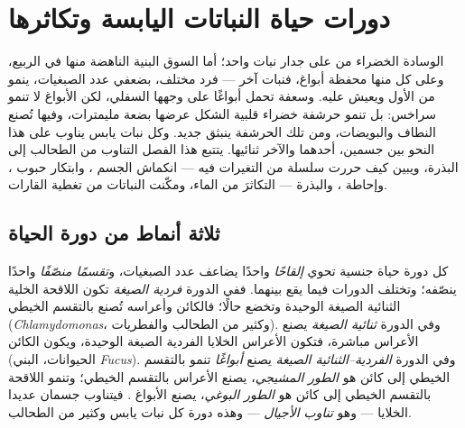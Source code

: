 \chapter{دورات حياة النباتات اليابسة وتكاثرها}\label{ch:b2:plant-life-cycles}

الوسادة الخضراء من  على جدار نبات واحد؛ أما السوق البنية
الناهضة منها في الربيع، وعلى كل منها محفظة أبواغ، فنبات آخر --- فرد
مختلف، بضعفي عدد الصبغيات، ينمو من الأول ويعيش عليه. وسعفة 
تحمل أبواغًا على وجهها السفلي، لكن الأبواغ لا تنمو سراخس: بل تنمو
حرشفة خضراء قلبية الشكل عرضها بضعة مليمترات، وفيها تُصنع النطاف
والبويضات، ومن تلك الحرشفة ينبثق  جديد. وكل نبات يابس يناوب على
هذا النحو بين جسمين، أحدهما  والآخر ثنائيها. يتتبع هذا
الفصل التناوب من الطحالب إلى البذرة، ويبين كيف حررت سلسلة من
التغيرات فيه --- انكماش الجسم ، وابتكار حبوب ،
وإحاطة ، والبذرة --- التكاثرَ من الماء، ومكّنت النباتات من
تغطية القارات.

\section{ثلاثة أنماط من دورة الحياة}

\begin{definition}\label{def:b2:plant-life-cycles:cycles}
كل دورة حياة جنسية تحوي \emph{إلقاحًا} واحدًا يضاعف عدد الصبغيات،
و\emph{تقسمًا منصّفًا} واحدًا ينصّفه؛ وتختلف الدورات فيما يقع بينهما.
ففي الدورة \emph{فردية الصيغة} تكون اللاقحة الخلية الثنائية الصيغة
الوحيدة وتخضع  حالًا؛ فالكائن  وأعراسه
تُصنع بالتقسم الخيطي (\emph{Chlamydomonas}، وكثير من الطحالب
والفطريات). وفي الدورة \emph{ثنائية الصيغة} يصنع 
الأعراس مباشرة، فتكون الأعراس الخلايا الفردية الصيغة الوحيدة، ويكون
الكائن  (الحيوانات،  البني \emph{Fucus}). وفي
الدورة \emph{الفردية--الثنائية الصيغة} يصنع 
\emph{أبواغًا} تنمو بالتقسم الخيطي إلى كائن  هو
\emph{الطور المشيجي}، يصنع الأعراس بالتقسم الخيطي؛ وتنمو اللاقحة
بالتقسم الخيطي إلى كائن  هو \emph{الطور البوغي}، يصنع
الأبواغ . فيتناوب جسمان عديدا الخلايا --- وهو
\emph{تناوب الأجيال} --- وهذه دورة كل نبات يابس وكثير من الطحالب.
\end{definition}

